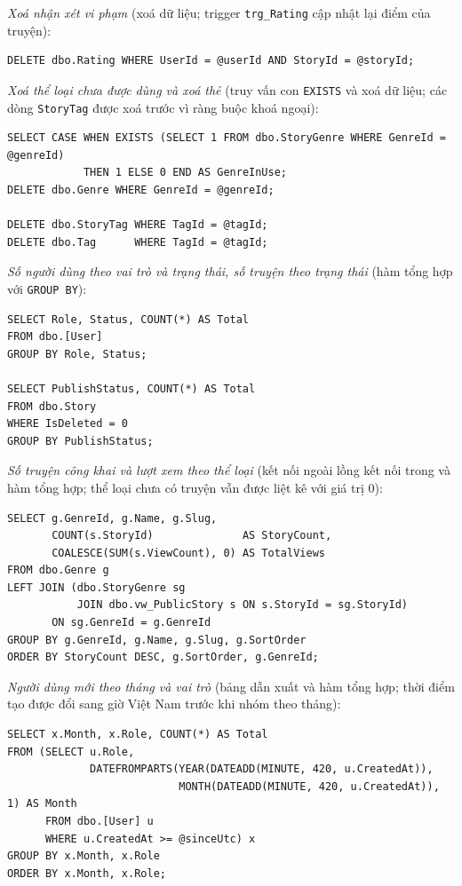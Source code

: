 \textit{Xoá nhận xét vi phạm} (xoá dữ liệu; trigger \texttt{trg\_Rating} cập nhật lại điểm của truyện):
\begin{verbatim}
DELETE dbo.Rating WHERE UserId = @userId AND StoryId = @storyId;
\end{verbatim}

\textit{Xoá thể loại chưa được dùng và xoá thẻ} (truy vấn con \texttt{EXISTS} và xoá dữ liệu; các dòng \texttt{StoryTag} được xoá trước vì ràng buộc khoá ngoại):
\begin{verbatim}
SELECT CASE WHEN EXISTS (SELECT 1 FROM dbo.StoryGenre WHERE GenreId = @genreId)
            THEN 1 ELSE 0 END AS GenreInUse;
DELETE dbo.Genre WHERE GenreId = @genreId;

DELETE dbo.StoryTag WHERE TagId = @tagId;
DELETE dbo.Tag      WHERE TagId = @tagId;
\end{verbatim}

\textit{Số người dùng theo vai trò và trạng thái, số truyện theo trạng thái} (hàm tổng hợp với \texttt{GROUP BY}):
\begin{verbatim}
SELECT Role, Status, COUNT(*) AS Total
FROM dbo.[User]
GROUP BY Role, Status;

SELECT PublishStatus, COUNT(*) AS Total
FROM dbo.Story
WHERE IsDeleted = 0
GROUP BY PublishStatus;
\end{verbatim}

\textit{Số truyện công khai và lượt xem theo thể loại} (kết nối ngoài lồng kết nối trong và hàm tổng hợp; thể loại chưa có truyện vẫn được liệt kê với giá trị 0):
\begin{verbatim}
SELECT g.GenreId, g.Name, g.Slug,
       COUNT(s.StoryId)              AS StoryCount,
       COALESCE(SUM(s.ViewCount), 0) AS TotalViews
FROM dbo.Genre g
LEFT JOIN (dbo.StoryGenre sg
           JOIN dbo.vw_PublicStory s ON s.StoryId = sg.StoryId)
       ON sg.GenreId = g.GenreId
GROUP BY g.GenreId, g.Name, g.Slug, g.SortOrder
ORDER BY StoryCount DESC, g.SortOrder, g.GenreId;
\end{verbatim}

\textit{Người dùng mới theo tháng và vai trò} (bảng dẫn xuất và hàm tổng hợp; thời điểm tạo được đổi sang giờ Việt Nam trước khi nhóm theo tháng):
\begin{verbatim}
SELECT x.Month, x.Role, COUNT(*) AS Total
FROM (SELECT u.Role,
             DATEFROMPARTS(YEAR(DATEADD(MINUTE, 420, u.CreatedAt)),
                           MONTH(DATEADD(MINUTE, 420, u.CreatedAt)), 1) AS Month
      FROM dbo.[User] u
      WHERE u.CreatedAt >= @sinceUtc) x
GROUP BY x.Month, x.Role
ORDER BY x.Month, x.Role;
\end{verbatim}

